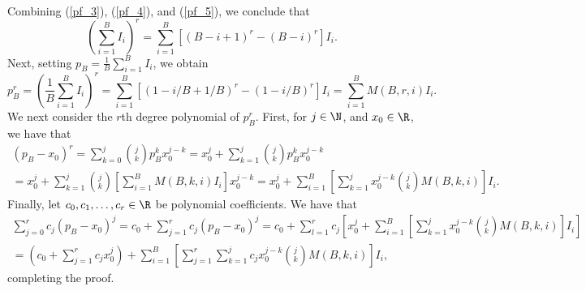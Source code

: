 \documentclass[12pt]{article}
\begin{document}
\begin{appendices}
\begin{multline}
\end{multline}
Combining (\ref{pf_3}), (\ref{pf_4}), and (\ref{pf_5}), we conclude that
$$ \left( \sum_{i=1}^B I_i \right)^r = \sum_{i=1}^B \left[ (B - i + 1)^r - (B - i)^r \right] I_i.$$
Next, setting $p_B = \frac{1}{B} \sum_{i=1}^B I_i$, we obtain
$$p^r_B = \left( \frac{1}{B}\sum_{i=1}^B I_i \right)^r = \sum_{i=1}^B \left[ (1 - i/B + 1/B)^r - (1 - i/B)^r \right] I_i = \sum_{i=1}^B M(B,r,i) I_i.$$ We next consider the $r$th degree polynomial of $p^r_B$. First, for $j \in \N$, and $x_0 \in \R$, we have that
\begin{multline*}
\left( p_B - x_0 \right)^r = \sum_{k=0}^j \binom{j}{k} p_B^k x_0^{j-k} = x^j_0 + \sum_{k=1}^j \binom{j}{k}p_B^k x_0^{j - k} \\ = x^j_0 + \sum_{k=1}^j \binom{j}{k} \left[ \sum_{i=1}^B M(B,k,i) I_i \right] x^{j-k}_0  = x^j_0 + \sum_{i=1}^B  \left[ \sum_{k=1}^j x_0^{j-k} \binom{j}{k} M(B,k,i) \right] I_i.
\end{multline*}
Finally, let $c_0, c_1, \dots, c_r \in \R$ be polynomial coefficients. We have that
\begin{multline*}
\sum_{j=0}^r c_j \left(p_B - x_0 \right)^j  = c_0 + \sum_{j=1}^r c_j (p_B - x_0)^j = c_0 + \sum_{l=1}^r c_j \left[x_0^j + \sum_{i=1}^B \left[\sum_{k=1}^j x_0^{j-k} \binom{j}{k} M(B,k,i) \right] I_i \right] \\ = \left(c_0 + \sum_{j=1}^r c_j x_0^j \right) + \sum_{i=1}^B \left[\sum_{j=1}^r \sum_{k=1}^j c_j x_0^{j-k} \binom{j}{k} M(B,k,i) \right] I_i,
\end{multline*}
completing the proof.




\end{appendices}
\end{document}
